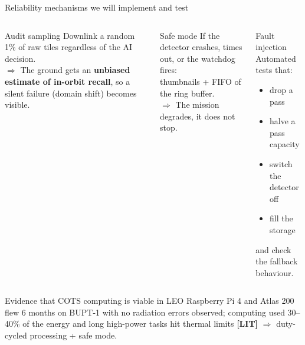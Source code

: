 \documentclass[aspectratio=169,10pt]{beamer}
\newcommand{\LITtag}{\textcolor{muted}{\textbf{[LIT]}}}
\begin{document}
\begin{frame}{Reliability mechanisms we will implement and test}
\begin{columns}[T]
\begin{block}{Audit sampling}
\footnotesize Downlink a random 1\% of raw tiles regardless of the AI decision.\\[1mm]
$\Rightarrow$ The ground gets an \textbf{unbiased estimate of in-orbit recall}, so a silent failure (domain shift) becomes visible.
\end{block}
\begin{block}{Safe mode}
\footnotesize If the detector crashes, times out, or the watchdog fires:\\[1mm]
thumbnails + FIFO of the ring buffer.\\[1mm]
$\Rightarrow$ The mission degrades, it does not stop.
\end{block}
\begin{block}{Fault injection}
\footnotesize Automated tests that:
\begin{itemize}
  \item drop a pass
  \item halve a pass capacity
  \item switch the detector off
  \item fill the storage
\end{itemize}
and check the fallback behaviour.
\end{block}
\end{columns}
\vspace{3mm}
\begin{alertblock}{Evidence that COTS computing is viable in LEO}
\footnotesize Raspberry Pi 4 and Atlas 200 flew 6 months on BUPT-1 with no radiation errors observed; computing used 30--40\% of the energy and long high-power tasks hit thermal limits \LITtag{} $\Rightarrow$ duty-cycled processing + safe mode.
\end{alertblock}
\end{frame}
\end{document}

